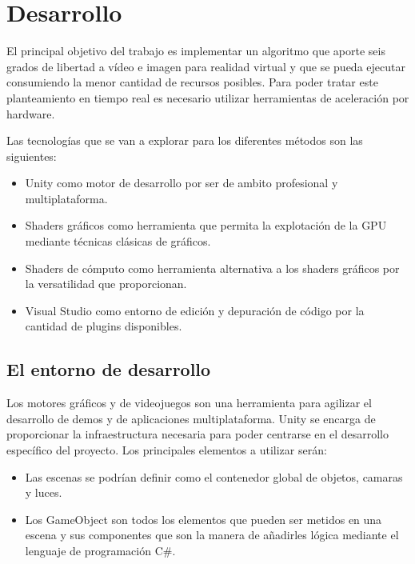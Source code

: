 
\pagestyle{empty}
\chapter {Desarrollo}

El principal objetivo del trabajo es implementar un algoritmo que aporte seis grados de libertad a vídeo e imagen para realidad virtual y que se pueda ejecutar consumiendo la menor cantidad de recursos posibles. Para poder tratar este planteamiento en tiempo real es necesario utilizar herramientas de aceleración por hardware.

Las tecnologías que se van a explorar para los diferentes métodos son las siguientes:

\begin{itemize}
\item Unity como motor de desarrollo por ser de ambito profesional y multiplataforma.
\item Shaders gráficos como herramienta que permita la explotación de la GPU mediante técnicas clásicas de gráficos.
\item Shaders de cómputo como herramienta alternativa a los shaders gráficos por la versatilidad que proporcionan.
\item Visual Studio como entorno de edición y depuración de código por la cantidad de plugins disponibles.
\end{itemize}

\section{El entorno de desarrollo}

Los motores gráficos y de videojuegos son una herramienta para agilizar el desarrollo de demos y de aplicaciones multiplataforma. Unity se encarga de proporcionar la infraestructura necesaria para poder centrarse en el desarrollo específico del proyecto. Los principales elementos a utilizar serán:

\begin{itemize}
\item Las escenas se podrían definir como el contenedor global de objetos, camaras y luces.
\item Los GameObject son todos los elementos que pueden ser metidos en una escena y sus componentes que son la manera de añadirles lógica mediante el lenguaje de programación C#.
\end{itemize}

